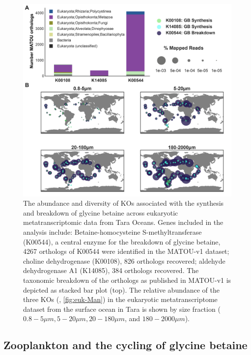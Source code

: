 \documentclass[utf8]{frontiersSCNS} %
\providecommand{\DIFaddtex}[1]{{\protect\color{blue}\uwave{#1}}} %
\providecommand{\DIFaddFL}[1]{\DIFadd{#1}} %
\providecommand{\DIFaddbeginFL}{} %
\providecommand{\DIFaddendFL}{} %
\providecommand{\DIFadd}[1]{\texorpdfstring{\DIFaddtex{#1}}{#1}} %
\begin{document}
\begin{figure}[t!]
    \centering
    \includegraphics[width=0.85\columnwidth]{Figures/Euk_K00544_GBbreakdown-01.png}
    \caption{The abundance and diversity of KOs associated with the synthesis and breakdown of glycine betaine across eukaryotic metatranscriptomic data from Tara Oceans. Genes included in the analysis include: Betaine-homocysteine S-methyltransferase (K00544), a central enzyme for the breakdown of glycine betaine, 4267 orthologs of K00544 were identified in the MATOU-v1 dataset; choline dehydrogenase (K00108), 826 orthologs recovered; aldehyde dehydrogenase A1 (K14085), 384 orthologs recovered. \DIFaddbeginFL \DIFaddFL{(A) }\DIFaddendFL The taxonomic breakdown of the orthologs as published in MATOU-v1 is depicted as stacked bar plot (top). \DIFaddbeginFL \DIFaddFL{(B) }\DIFaddendFL The relative abundance of the three KOs (, \ref{fig:euk-Man}) in the eukaryotic metatranscriptome dataset from the surface ocean in Tara is shown by size fraction ($0.8-5 \mu m, 5-20 \mu m, 20-180 \mu m$, and $180-2000\mu m$).}
    \label{fig:tara-meta}
\end{figure}

\subsection{Zooplankton and the cycling of glycine betaine}
\end{document}
